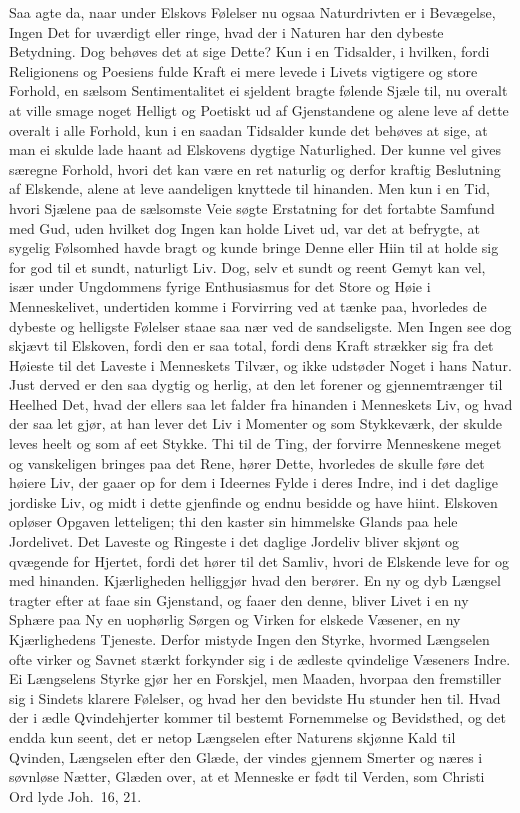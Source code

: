 \documentclass[12pt,a4paper]{book}
\newcommand{\apage}[1]{\marginnote{\footnotesize\textit{[#1]}}}
\begin{document}
Saa agte da, naar under Elskovs Følelser nu ogsaa Naturdrivten er i
Bevægelse, Ingen Det for uværdigt eller ringe, hvad der i Naturen har
den dybeste Betydning. Dog behøves det at sige Dette? Kun i en
Tidsalder, i hvilken, fordi Religionens og Poesiens fulde Kraft ei mere
levede i Livets vigtigere og store Forhold, en sælsom Sentimentalitet ei
sjeldent bragte følende Sjæle til, nu overalt at ville smage noget
Helligt og Poetiskt ud af Gjenstandene og alene leve af dette overalt i
alle Forhold, kun i en saadan Tidsalder kunde det behøves at sige, at
man ei skulde lade haant ad Elskovens dygtige Naturlighed. Der kunne vel
gives særegne Forhold, hvori det kan være en ret naturlig og derfor
kraftig Beslutning af Elskende, alene at leve aandeligen knyttede til
hinanden. Men kun i en Tid, hvori Sjælene paa de sælsomste Veie søgte
Erstatning for det fortabte Samfund med Gud, uden hvilket dog Ingen kan
holde Livet ud, var det at befrygte, at sygelig Følsomhed havde bragt og
kunde bringe Denne eller Hiin til at holde sig for god til et sundt,
\apage{45} naturligt Liv. Dog, selv et sundt og reent Gemyt kan vel, især under
Ungdommens fyrige Enthusiasmus for det Store og Høie i Menneskelivet,
undertiden komme i Forvirring ved at tænke paa, hvorledes de dybeste og
helligste Følelser staae saa nær ved de sandseligste. Men Ingen see dog
skjævt til Elskoven, fordi den er saa total, fordi dens Kraft strækker
sig fra det Høieste til det Laveste i Menneskets Tilvær, og ikke udstøder
Noget i hans Natur. Just derved er den saa dygtig og herlig, at den let
forener og gjennemtrænger til Heelhed Det, hvad der ellers saa let
falder fra hinanden i Menneskets Liv, og hvad der saa let gjør, at han
lever det Liv i Momenter og som Stykkeværk, der skulde leves heelt og
som af eet Stykke. Thi til de Ting, der forvirre Menneskene meget og
vanskeligen bringes paa det Rene, hører Dette, hvorledes de skulle føre
det høiere Liv, der gaaer op for dem i Ideernes Fylde i deres Indre, ind
i det daglige jordiske Liv, og midt i dette gjenfinde og endnu besidde
og have hiint. Elskoven opløser Opgaven letteligen; thi den kaster sin
himmelske Glands paa hele Jordelivet. Det Laveste og Ringeste i det
daglige Jordeliv bliver skjønt og qvægende for Hjertet, fordi det hører
til det Samliv, hvori de Elskende leve for og med hinanden. Kjærligheden
helliggjør hvad den berører. En ny og dyb Længsel tragter efter at faae
sin Gjenstand, og faaer den denne, bliver Livet i en ny Sphære paa Ny
en uophørlig Sørgen og Virken for elskede Væsener, en ny \apage{46} Kjærlighedens
Tjeneste. Derfor mistyde Ingen den Styrke, hvormed Længselen ofte virker
og Savnet stærkt forkynder sig i de ædleste qvindelige Væseners Indre.
Ei Længselens Styrke gjør her en Forskjel, men Maaden, hvorpaa den
fremstiller sig i Sindets klarere Følelser, og hvad her den bevidste Hu
stunder hen til. Hvad der i ædle Qvindehjerter kommer til bestemt
Fornemmelse og Bevidsthed, og det endda kun seent, det er netop
Længselen efter Naturens skjønne Kald til Qvinden, Længselen efter den
Glæde, der vindes gjennem Smerter og næres i søvnløse Nætter, Glæden
over, at et Menneske er født til Verden, som Christi Ord lyde Joh.\ 16,
21.
\end{document}
